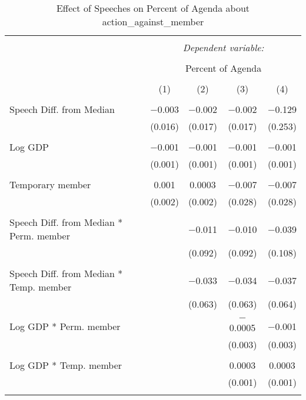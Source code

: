 
\begin{table}[!htbp] \centering 
  \caption{Effect of Speeches on Percent of Agenda about action_against_member} 
  \label{} 
\begin{tabular}{@{\extracolsep{5pt}}lcccc} 
\\[-1.8ex]\hline 
\hline \\[-1.8ex] 
 & \multicolumn{4}{c}{\textit{Dependent variable:}} \\ 
\cline{2-5} 
\\[-1.8ex] & \multicolumn{4}{c}{Percent of Agenda} \\ 
\\[-1.8ex] & (1) & (2) & (3) & (4)\\ 
\hline \\[-1.8ex] 
 Speech Diff. from Median & $-$0.003 & $-$0.002 & $-$0.002 & $-$0.129 \\ 
  & (0.016) & (0.017) & (0.017) & (0.253) \\ 
  & & & & \\ 
 Log GDP & $-$0.001 & $-$0.001 & $-$0.001 & $-$0.001 \\ 
  & (0.001) & (0.001) & (0.001) & (0.001) \\ 
  & & & & \\ 
 Temporary member & 0.001 & 0.0003 & $-$0.007 & $-$0.007 \\ 
  & (0.002) & (0.002) & (0.028) & (0.028) \\ 
  & & & & \\ 
 Speech Diff. from Median * Perm. member &  & $-$0.011 & $-$0.010 & $-$0.039 \\ 
  &  & (0.092) & (0.092) & (0.108) \\ 
  & & & & \\ 
 Speech Diff. from Median * Temp. member &  & $-$0.033 & $-$0.034 & $-$0.037 \\ 
  &  & (0.063) & (0.063) & (0.064) \\ 
  & & & & \\ 
 Log GDP * Perm. member &  &  & $-$0.0005 & $-$0.001 \\ 
  &  &  & (0.003) & (0.003) \\ 
  & & & & \\ 
 Log GDP * Temp. member &  &  & 0.0003 & 0.0003 \\ 
  &  &  & (0.001) & (0.001) \\ 
  & & & & \\ 

\end{tabular}
\end{table}
